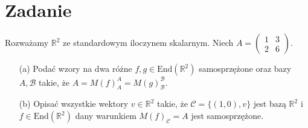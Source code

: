 \documentclass[11pt]{scrartcl}
\begin{document}
        \section{Zadanie}
            \begin{zadanie}
              Rozważamy $\mathbb{R}^2$ ze standardowym iloczynem skalarnym. Niech $A = \begin{pmatrix} 1 & 3 \\ 2 & 6 \end{pmatrix}$.

\begin{itemize}
    \item[(a)] Podać wzory na dwa różne $f, g \in \text{End}(\mathbb{R}^2)$ samosprzężone oraz bazy $A, \mathcal{B}$ takie, że $A = M(f)_A^A = M(g)_\mathcal{B}^\mathcal{B}$.
    \item[(b)] Opisać wszystkie wektory $v \in \mathbb{R}^2$ takie, że $\mathcal{C} = \{(1,0), v\}$ jest bazą $\mathbb{R}^2$ i $f \in \text{End}(\mathbb{R}^2)$ dany warunkiem $M(f)_\mathcal{C} = A$ jest samosprzężone.
\end{itemize}
            \end{zadanie}
            
\end{document}
